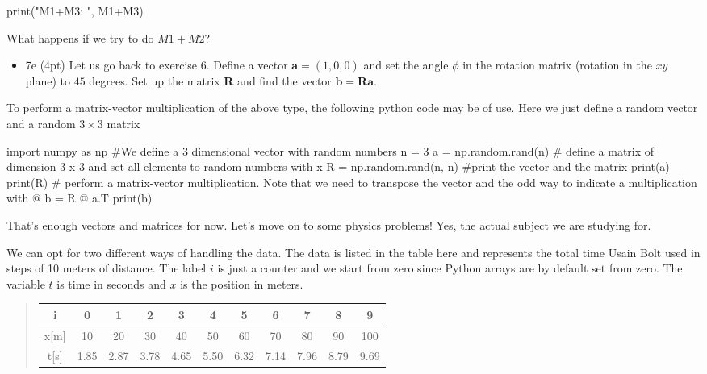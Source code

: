 \documentclass[%
oneside,                 %
final,                   %
10pt]{article}
\begin{document}
\bpycod
print("M1+M3: ", M1+M3)

\epycod

What happens if we try to do $M1+M2$?

\begin{itemize}
\item 7e (4pt) Let us go back to exercise 6. Define a vector $\bm{a}=(1,0,0)$ and set the angle $\phi$ in the rotation matrix (rotation in the $xy$ plane) to $45$ degrees. Set up the matrix $\bm{R}$ and find the vector $\bm{b}=\bm{R}\bm{a}$.
\end{itemize}

\noindent
To perform a matrix-vector multiplication of the above type, the following python code may be of use. Here we just define a random vector and a random $3\times 3$ matrix













\bpycod
import numpy as np
#We define a  3 dimensional vector with random numbers
n = 3
a = np.random.rand(n)
# define a matrix of dimension 3 x 3 and set all elements to random numbers with x \in [0, 1]
R = np.random.rand(n, n)
#print the vector and the matrix
print(a)
print(R)
# perform a matrix-vector multiplication. Note that we need to transpose the vector and the odd way to indicate a multiplication with @
b = R @ a.T
print(b)

\epycod


That's enough vectors and matrices for now. Let's move on to some physics problems! Yes, the actual subject we are studying for. 

We can opt for two different ways of handling the data. The data is listed in the table here and represents the total time Usain Bolt used in steps of  10 meters of distance. The label $i$ is just a counter and we start from zero since Python arrays are by default set from zero. The variable $t$ is time in seconds and $x$ is the position in meters.


\begin{quote}
\begin{tabular}{ccccccccccc}
\hline
\multicolumn{1}{c}{ i } & \multicolumn{1}{c}{ 0 } & \multicolumn{1}{c}{ 1 } & \multicolumn{1}{c}{ 2 } & \multicolumn{1}{c}{ 3 } & \multicolumn{1}{c}{ 4 } & \multicolumn{1}{c}{ 5 } & \multicolumn{1}{c}{ 6 } & \multicolumn{1}{c}{ 7 } & \multicolumn{1}{c}{ 8 } & \multicolumn{1}{c}{ 9 } \\
\hline
x[m] & 10   & 20   & 30   & 40   & 50   & 60   & 70   & 80   & 90   & 100  \\
\hline
t[s] & 1.85 & 2.87 & 3.78 & 4.65 & 5.50 & 6.32 & 7.14 & 7.96 & 8.79 & 9.69 \\
\hline
\end{tabular}
\end{quote}
\end{document}
